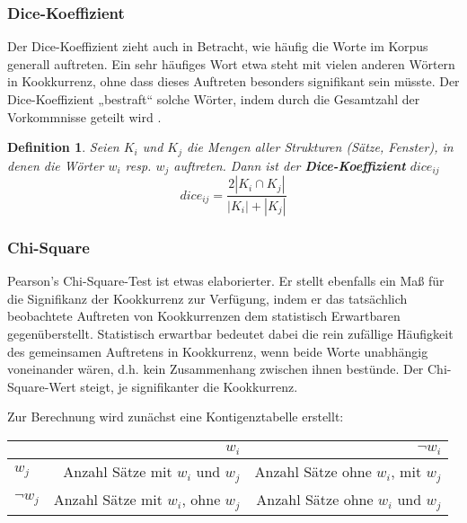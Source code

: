 \documentclass[11pt,numbers=noenddot]{scrartcl}
\newtheorem*{defi}{Definition}
\begin{document}
\subsubsection{Dice-Koeffizient}

Der Dice-Koeffizient zieht auch in Betracht, wie häufig die Worte im Korpus generall auftreten. Ein sehr häufiges Wort etwa steht mit vielen anderen Wörtern in Kookkurrenz, ohne dass dieses Auftreten besonders signifikant sein müsste. Der Dice-Koeffizient „bestraft“ solche Wörter, indem durch die Gesamtzahl der Vorkommnisse geteilt wird \citep[S. 299]{manning1999}.

\begin{defi}
Seien $K_{i}$ und $K_{j}$ die Mengen aller Strukturen (Sätze, Fenster), in denen die Wörter $w_i$ resp. $w_j$ auftreten. Dann ist der \textbf{Dice-Koeffizient} $dice_{ij}$
\begin{equation*}
   dice_{ij} = \frac{2 |K_{i} \cap K_{j}| }{|K_{i}| + |K_{j}|}
\end{equation*}
\end{defi}

\subsubsection{Chi-Square}

Pearson's Chi-Square-Test ist etwas elaborierter. Er stellt ebenfalls ein Maß für die Signifikanz der Kookkurrenz zur Verfügung, indem er das tatsächlich beobachtete Auftreten von Kookkurrenzen dem statistisch Erwartbaren gegenüberstellt. Statistisch erwartbar bedeutet dabei die rein zufällige Häufigkeit des gemeinsamen Auftretens in Kookkurrenz, wenn beide Worte unabhängig voneinander wären, d.h. kein Zusammenhang zwischen ihnen bestünde. Der Chi-Square-Wert steigt, je signifikanter die Kookkurrenz.

Zur Berechnung wird zunächst eine Kontigenztabelle erstellt:
\begin{table}[h]
    \begin{center}
        \begin{tabular}{l|r|r}
                    & $w_i$ & $\neg w_i$ \\ \hline
            $w_j$ &  Anzahl Sätze mit $w_i$ und $w_j$ & Anzahl Sätze ohne $w_i$, mit $w_j$\\ \hline
            $\neg w_j$ &  Anzahl Sätze mit $w_i$, ohne $w_j$ & Anzahl Sätze ohne $w_i$ und $w_j$
        \end{tabular}
    \end{center}
\end{table}
\end{document}
